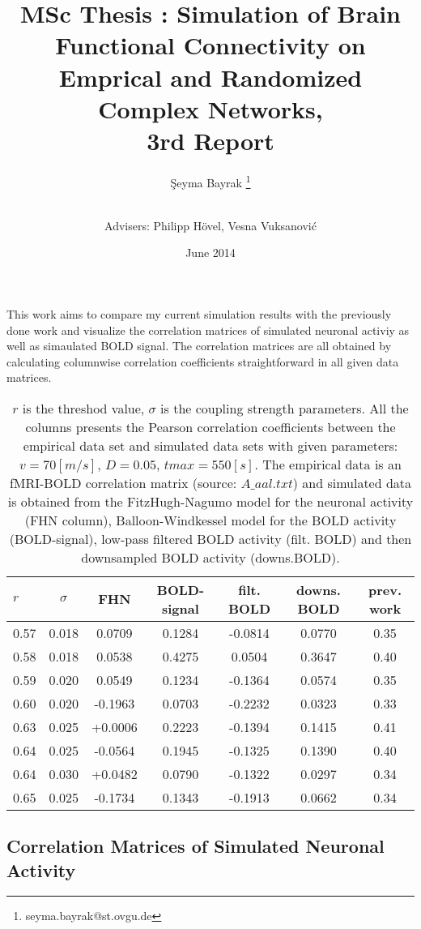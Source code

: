 \documentclass[12pt]{article}
\title{MSc Thesis : Simulation of Brain Functional Connectivity on Emprical and Randomized Complex Networks, \\ 3rd Report}
\author[1]{\c{S}eyma Bayrak \thanks{seyma.bayrak@st.ovgu.de}}
\author[ ]{\\ Advisers: Philipp H\"{o}vel, Vesna Vuksanovi\'c}
\affil[1]{\footnotesize{Integrative Neuroscience MSc, Otto von Guericke University, Magdeburg}}
\date{June 2014}
\begin{document}
   \maketitle
This work aims to compare my current simulation results with the previously done work and visualize the correlation matrices of simulated neuronal activiy as well as simaulated BOLD signal. The correlation matrices are all obtained by calculating columnwise correlation coefficients straightforward in all given data matrices. 
\begin{table}[h]

		\caption{$r$ is the threshod value, $\sigma$ is the coupling strength parameters. All the columns presents the Pearson correlation coefficients between the empirical data set and simulated data sets with given parameters: $v=70[m/s]$, $D=0.05$, $tmax=550[s]$. The empirical data is an fMRI-BOLD correlation matrix (source: $A\_aal.txt$) and simulated data is obtained from the FitzHugh-Nagumo model for the neuronal activity (FHN column), Balloon-Windkessel model for the BOLD activity (BOLD-signal), low-pass filtered BOLD activity (filt. BOLD) and then downsampled BOLD activity (downs.BOLD). 	}
	\begin{tabular}{l | c | c | c | c | c | c } \hline
$r$  &  $\sigma$ & FHN     & BOLD-signal & filt. BOLD    & downs. BOLD & prev. work  \\ \hline \hline
0.57 &  0.018 	 & 0.0709  &	0.1284	 &	-0.0814		 &	0.0770	   & 0.35   	    \\ \hline
0.58 &  0.018    & 0.0538  &	0.4275	 &	0.0504		 &	0.3647	   & 0.40			\\ \hline
0.59 &  0.020    & 0.0549  &	0.1234	 &	-0.1364		 &	0.0574	   & 0.35			\\ \hline
0.60 &  0.020    & -0.1963 &	0.0703	 &	-0.2232		 &	0.0323	   & 0.33			\\ \hline
0.63 &  0.025    & +0.0006 &	0.2223	 &	-0.1394		 &	0.1415	   & 0.41			\\ \hline
0.64 &  0.025    & -0.0564 &	0.1945	 &	-0.1325		 &	0.1390	   & 0.40			\\ \hline
0.64 &  0.030    & +0.0482 &	0.0790	 &	-0.1322		 &	0.0297	   & 0.34			\\ \hline
0.65 &  0.025    & -0.1734 &	0.1343	 &	-0.1913		 &	0.0662	   & 0.34    		\\ \hline
	\end{tabular}
  
\end{table}    

\subsection{Correlation Matrices of Simulated Neuronal Activity}
\end{document}

